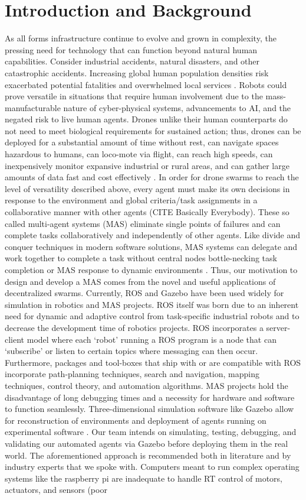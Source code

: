 \documentclass[conference]{IEEEtran}
\begin{document}
\section{Introduction and Background}
As all forms infrastructure continue to evolve and grown in complexity, the pressing need for technology that can function beyond natural human capabilities. Consider industrial accidents, natural disasters, and other catastrophic accidents. Increasing global human population densities risk exacerbated potential fatalities and overwhelmed local services \cite{RN94, RN100, RN104, RN106}. Robots could prove versatile in situations that require human involvement due to the mass-manufacturable nature of cyber-physical systems, advancements to AI, and the negated risk to live human agents. Drones unlike their human counterparts do not need to meet biological requirements for sustained action; thus, drones can be deployed for a substantial amount of time without rest, can navigate spaces hazardous to humans, can loco-mote via flight, can reach high speeds, can inexpensively monitor expansive industrial or rural areas, and can gather large amounts of data fast and cost effectively \cite{RN101}. In order for drone swarms to reach the level of versatility described above, every agent must make its own decisions in response to the environment and global criteria/task assignments in a collaborative manner with other agents (CITE Basically Everybody). These so called multi-agent systems (MAS) eliminate single points of failures and can complete tasks collaboratively and independently of other agents. Like divide and conquer techniques in modern software solutions, MAS systems can delegate and work together to complete a task without central nodes bottle-necking task completion or MAS response to dynamic environments \cite{RN100}. Thus, our motivation to design and develop a MAS comes from the novel and useful applications of decentralized swarms. Currently, ROS and Gazebo have been used widely for simulation in robotics and MAS projects. ROS itself was born due to an inherent need for dynamic and adaptive control from task-specific industrial robots and to decrease the development time of robotics projects. ROS incorporates a server-client model where each ‘robot’ running a ROS program is a node that can ‘subscribe’ or listen to certain topics where messaging can then occur. Furthermore, packages and tool-boxes that ship with or are compatible with ROS incorporate path-planning techniques, search and navigation, mapping techniques, control theory, and automation algorithms. MAS projects hold the disadvantage of long debugging times and a necessity for hardware and software to function seamlessly. Three-dimensional simulation software like Gazebo allow for reconstruction of environments and deployment of agents running on experimental software \cite{RN104}. Our team intends on simulating, testing, debugging, and validating our automated agents via Gazebo before deploying them in the real world. The aforementioned approach is recommended both in literature and by industry experts that we spoke with. Computers meant to run complex operating systems like the raspberry pi are inadequate to handle RT control of motors, actuators, and sensors (poor 
\end{document}
